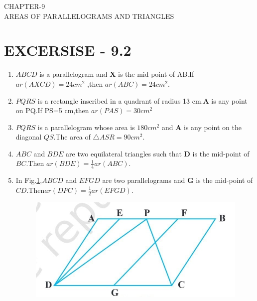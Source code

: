 \documentclass{article}
\let\vec\mathbf{}
\let\vec\mathbf
\begin{document}
\begin{center}
\textbf\large{CHAPTER-9  \\ AREAS OF PARALLELOGRAMS AND TRIANGLES}
\section*{EXCERSISE - 9.2}
\end{center}
\begin{enumerate}
\item $ABCD$ is a parallelogram and $\vec{X}$ is the mid-point of AB.If $ ar(AXCD)= 24 cm^2 $ ,then $ar(ABC) =  24cm^2 $.
\item $PQRS$ is a rectangle inscribed in a quadrant of radius 13 cm.$\vec{A}$ is any point on PQ.If PS=5 cm,then $ar(PAS)= 30 cm^2 $
\item $PQRS$ is a parallelogram whose area is $ 180 cm^2 $ and $\vec{A}$ is any point on the diagonal $QS$.The area of $\triangle ASR =90 cm^2$.
\item $ABC$ and $BDE$ are two equilateral triangles such that $\vec{D}$ is the mid-point of $BC$.Then $ar(BDE)=\frac{1}{4}  ar(ABC)$.
\item In Fig.\ref{figs:9.8.},$ABCD$ and $EFGD$ are two parallelograms and $\vec{G}$ is the mid-point of $CD$.Then$ ar(DPC)=\frac{1}{2}  ar(EFGD)$.
\begin{figure}[h]
	\centering
	\includegraphics[width=\columnwidth]{figs/9.8.jpg}
	\caption{}
	\label{figs:9.8.}
\end{figure}

\end{enumerate}
\end{document}

